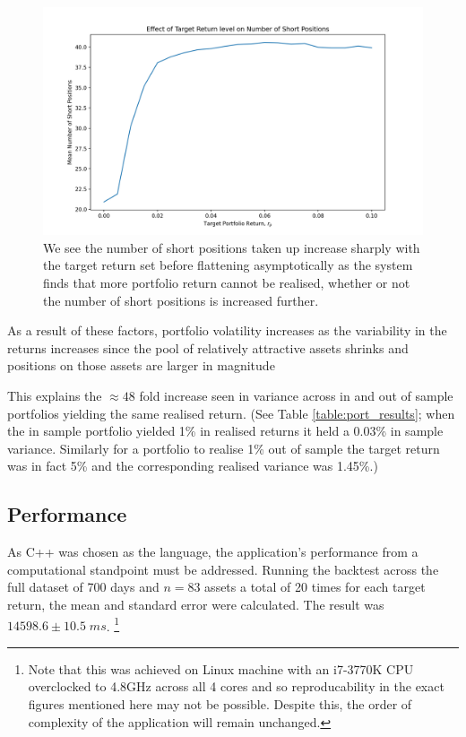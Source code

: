 \documentclass{article}
\begin{document}
\begin{figure}[H]
	\centerline{\includegraphics[width=\textwidth]{figures/nShorts.png}}
	\caption{We see the number of short positions taken up increase sharply with the target return set before flattening asymptotically as the system finds that more portfolio return cannot be realised, whether or not the number of short positions is increased further.}
	\label{fig:nShorts}
\end{figure}


As a result of these factors, portfolio volatility increases as the variability in the returns increases since the pool of relatively attractive assets shrinks and positions on those assets are larger in magnitude

This explains the $\approx 48$ fold increase seen in variance across in and out of sample portfolios yielding the same realised return. (See Table \ref{table:port_results}; when the in sample portfolio yielded 1\% in realised returns it held a 0.03\% in sample variance. Similarly for a portfolio to realise 1\% out of sample the target return was in fact 5\% and the corresponding realised variance was 1.45\%.)



\subsection{Performance}

As C++ was chosen as the language, the application's performance from a computational standpoint must be addressed. Running the backtest across the full dataset of 700 days and $n=83$ assets a total of 20 times for each target return, the mean and standard error were calculated. The result was $14598.6 \pm 10.5\;ms$. \footnote{Note that this was achieved on Linux machine with an i7-3770K CPU overclocked to 4.8GHz across all 4 cores and so reproducability in the exact figures mentioned here may not be possible. Despite this, the order of complexity of the application will remain unchanged.}
\end{document}

